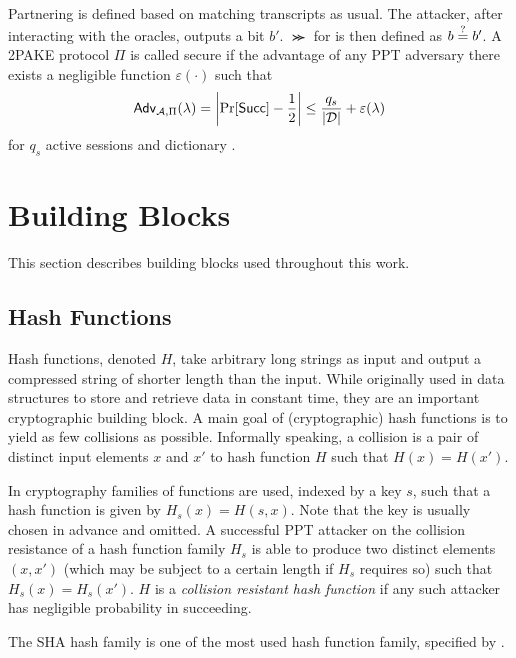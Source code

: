 \noindent
Partnering is defined based on matching transcripts as usual.
The attacker, after interacting with the oracles, outputs a bit $b'$.
$\Succ$ for \cA is then defined as $b\stackrel{?}{=} b'$.
A \ac{2PAKE} protocol $\Pi$ is called secure if the advantage of any \ac{PPT} adversary \cA there exists a negligible function $\varepsilon(\cdot)$ such that 
\[
  \mathsf{Adv}_{\mathcal{A},\Pi}(\lambda) = \left| \Pr[\mathsf{Succ}] - \frac12 \right| \leq \frac{q_s}{|\mathcal{D}|} + \varepsilon(\lambda)
\]
for $q_s$ active sessions and dictionary \cD.

\section{Building Blocks}
This section describes building blocks used throughout this work.


\subsection{Hash Functions}
Hash functions, denoted $H$, take arbitrary long strings as input and output a compressed string of shorter length than the input.
While originally used in data structures to store and retrieve data in constant time, they are an important cryptographic building block.
A main goal of (cryptographic) hash functions is to yield as few collisions as possible.
Informally speaking, a collision is a pair of distinct input elements $x$ and $x'$ to hash function $H$ such that $H(x)=H(x')$.

In cryptography families of functions are used, indexed by a key $s$, such that a hash function is given by $H_s(x)=H(s, x)$.
Note that the key is usually chosen in advance and omitted.
A successful \ac{PPT} attacker on the collision resistance of a hash function family $H_s$ is able to produce two distinct elements $(x,x')$ (which may be subject to a certain length if $H_s$ requires so) such that $H_s(x)=H_s(x')$.
$H$ is a \emph{collision resistant hash function} if any such attacker has negligible probability in succeeding.

The SHA hash family is one of the most used hash function family, specified by \citet{FIPS-180}.


